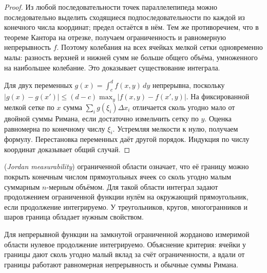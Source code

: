 \begin{proof}Из любой последовательности точек параллелепипеда можно последовательно выделить сходящиеся подпоследовательности по каждой из конечного числа координат; предел остаётся в нём. Тем же противоречием, что в теореме Кантора на отрезке, получаем ограниченность и равномерную непрерывность \(f\). Поэтому колебания на всех ячейках мелкой сетки одновременно малы: разность верхней и нижней сумм не больше общего объёма, умноженного на наибольшее колебание. Это доказывает существование интеграла.

Для двух переменных \(g(x)=\int_c^d f(x,y)\,dy\) непрерывна, поскольку \(|g(x)-g(x')|\le(d-c)\max_y|f(x,y)-f(x',y)|\). На фиксированной мелкой сетке по \(x\) сумма \(\sum_i g(\xi_i)\Delta x_i\) отличается сколь угодно мало от двойной суммы Римана, если достаточно измельчить сетку по \(y\). Оценка равномерна по конечному числу \(\xi_i\). Устремляя мелкости к нулю, получаем формулу. Перестановка переменных даёт другой порядок. Индукция по числу координат доказывает общий случай.\end{proof}
\begin{definition} (\emph{Jordan measurability}) ограниченной области означает, что её границу можно покрыть конечным числом прямоугольных ячеек со сколь угодно малым суммарным \(n\)-мерным объёмом. Для такой области интеграл задают продолжением ограниченной функции нулём на окружающий прямоугольник, если продолжение интегрируемо. У треугольников, кругов, многогранников и шаров граница обладает нужным свойством.\end{definition}
Для непрерывной функции на замкнутой ограниченной жорданово измеримой области нулевое продолжение интегрируемо. Объяснение критерия: ячейки у границы дают сколь угодно малый вклад за счёт ограниченности, а вдали от границы работают равномерная непрерывность и обычные суммы Римана.
